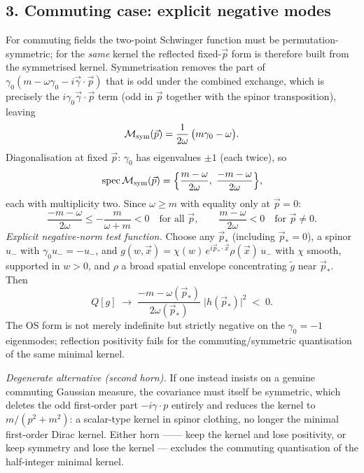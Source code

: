 \subsection*{3. Commuting case: explicit negative modes}
For commuting fields the two-point Schwinger function must be
permutation-symmetric; for the \emph{same} kernel the reflected
fixed-$\vec p$ form is therefore built from the symmetrised kernel.
Symmetrisation removes the part of
$\gamma_0(m-\omega\gamma_0-i\vec\gamma\!\cdot\!\vec p)$ that is odd
under the combined exchange, which is precisely the
$i\gamma_0\vec\gamma\!\cdot\!\vec p$ term (odd in $\vec p$ together
with the spinor transposition), leaving
\[
\mathcal M_{\rm sym}(\vec p)
=\frac{1}{2\omega}\,\bigl(m\gamma_0-\omega\bigr).
\]
Diagonalisation at fixed $\vec p$: $\gamma_0$ has eigenvalues
$\pm1$ (each twice), so
\[
\mathrm{spec}\,\mathcal M_{\rm sym}(\vec p)
=\Bigl\{\frac{m-\omega}{2\omega},\;
\frac{-m-\omega}{2\omega}\Bigr\},
\]
each with multiplicity two.
Since $\omega\ge m$ with equality only at $\vec p=0$:
\[
\frac{-m-\omega}{2\omega}\le-\frac{m}{\omega+m}<0
\quad\text{for all }\vec p,
\qquad
\frac{m-\omega}{2\omega}<0
\quad\text{for }\vec p\neq0.
\]
\emph{Explicit negative-norm test function.}
Choose any $\vec p_\ast$ (including $\vec p_\ast=0$), a spinor
$u_-$ with $\gamma_0 u_-=-u_-$, and
$g(w,\vec x)=\chi(w)\,e^{i\vec p_\ast\cdot\vec x}
\rho(\vec x)\,u_-$ with $\chi$ smooth, supported in $w>0$, and
$\rho$ a broad spatial envelope concentrating $\tilde g$ near
$\vec p_\ast$.
Then
\[
Q[g]\;\longrightarrow\;
\frac{-m-\omega(\vec p_\ast)}{2\omega(\vec p_\ast)}\;
\bigl|h(\vec p_\ast)\bigr|^2\;<\;0 .
\]
The OS form is not merely indefinite but strictly negative on the
$\gamma_0=-1$ eigenmodes; reflection positivity fails for the
commuting/symmetric quantisation of the same minimal kernel.

\emph{Degenerate alternative (second horn).}
If one instead insists on a genuine commuting Gaussian measure, the
covariance must itself be symmetric, which deletes the odd
first-order part $-i\gamma\!\cdot\!p$ entirely and reduces the
kernel to $m/(p^2+m^2)$: a scalar-type kernel in spinor clothing,
no longer the minimal first-order Dirac kernel.
Either horn —--- keep the kernel and lose positivity, or keep
symmetry and lose the kernel --- excludes the commuting
quantisation of the half-integer minimal kernel.

